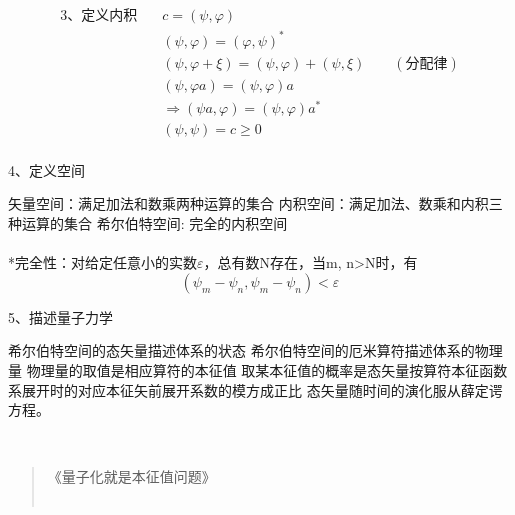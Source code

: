 \begin{frame} 
    \begin{equation*}
        \begin{split}
            \text{3、定义内积} \quad &c=(\psi, \varphi)\\
            &(\psi, \varphi)= (\varphi,\psi)^* \\
            &(\psi, \varphi+\xi)= (\psi, \varphi) + (\psi, \xi)\qquad (\text{分配律})\\
            &(\psi, \varphi a)= (\psi, \varphi )a \\
            &\Rightarrow (\psi a, \varphi )= (\psi, \varphi )a^* \\
            &(\psi,\psi)= c\ge 0\\
        \end{split}  
    \end{equation*}
\end{frame} 

\begin{frame}
    4、定义空间\\
   \begin{itemize}
       \Item 矢量空间：满足加法和数乘两种运算的集合
       \Item 内积空间：满足加法、数乘和内积三种运算的集合
       \Item 希尔伯特空间:  完全的内积空间\\
       ~~ \\
       *完全性：对给定任意小的实数$\varepsilon$，总有数N存在，当m, n>N时，有\\
       $$ (\psi_m -\psi_n, \psi_m -\psi_n )< \varepsilon $$
   \end{itemize} 
\end{frame} 

\begin{frame}
   5、描述量子力学\\
   \begin{itemize}
       \Item 希尔伯特空间的态矢量描述体系的状态
       \Item 希尔伯特空间的厄米算符描述体系的物理量
       \Item 物理量的取值是相应算符的本征值
       \Item 取某本征值的概率是态矢量按算符本征函数系展开时的对应本征矢前展开系数的模方成正比
       \Item 态矢量随时间的演化服从薛定谔方程。
   \end{itemize}
   ~~ \\ \vspace{1.0em}
   \begin{quote}
    《量子化就是本征值问题》\\
    ~~\\
 \end{quote}
\end{frame} 


